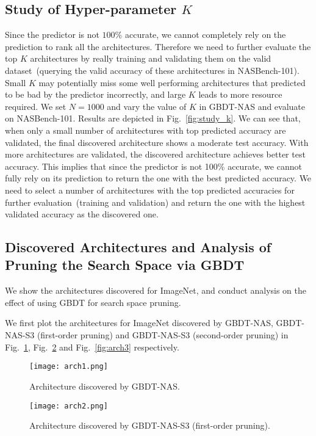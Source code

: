 \documentclass{article}
\begin{document}
\subsection{Study of Hyper-parameter $K$}
Since the predictor is not $100\%$ accurate, we cannot completely rely on the prediction to rank all the architectures. Therefore we need to further evaluate the top $K$ architectures by really training and validating them on the valid dataset~(querying the valid accuracy of these architectures in NASBench-101). Small $K$ may potentially miss some well performing architectures that predicted to be bad by the predictor incorrectly, and large $K$ leads to more resource required. We set $N=1000$ and vary the value of $K$ in GBDT-NAS and evaluate on NASBench-101. Results are depicted in Fig.~\ref{fig:study_k}. We can see that, when only a small number of architectures with top predicted accuracy are validated, the final discovered architecture shows a moderate test accuracy. With more architectures are validated, the discovered architecture achieves better test accuracy. This implies that since the predictor is not 100\% accurate, we cannot fully rely on its prediction to return the one with the best predicted accuracy. We need to select a number of architectures with the top predicted accuracies for further evaluation~(training and validation) and return the one with the highest validated accuracy as the discovered one.

\subsection{Discovered Architectures and Analysis of Pruning the Search Space via GBDT}
We show the architectures discovered for ImageNet, and conduct analysis on the effect of using GBDT for search space pruning.

We first plot the architectures for ImageNet discovered by GBDT-NAS, GBDT-NAS-S3 (first-order pruning) and GBDT-NAS-S3 (second-order pruning) in Fig.~\ref{fig:arch1}, Fig.~\ref{fig:arch2} and Fig.~\ref{fig:arch3} respectively.
\begin{figure}[htbp]
\centering
\texttt{[image: arch1.png]}
\caption{Architecture discovered by GBDT-NAS.}
\label{fig:arch1}
\end{figure}

\begin{figure}[htbp]
\centering
\texttt{[image: arch2.png]}
\caption{Architecture discovered by GBDT-NAS-S3 (first-order pruning).}
\label{fig:arch2}
\end{figure}
\end{document}
